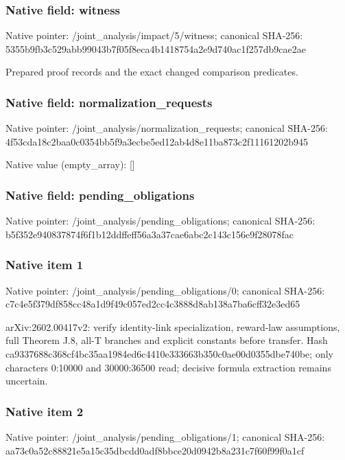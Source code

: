 \documentclass[10pt,a4paper]{article}
\begin{document}
\subsubsection{Native field: witness}
Native pointer: /joint\_\allowbreak{}analysis/impact/5/witness; canonical SHA-256: 5355b9fb3c529abb99043b7f05f8eca4b1418754a2e9d740ac1f257db9cae2ae

\begingroup\raggedright\sloppy Prepared proof records and the exact changed comparison predicates.\par\endgroup

\subsubsection{Native field: normalization\_\allowbreak{}requests}
Native pointer: /joint\_\allowbreak{}analysis/normalization\_\allowbreak{}requests; canonical SHA-256: 4f53cda18c2baa0c0354bb5f9a3ecbe5ed12ab4d8e11ba873c2f11161202b945

Native value (empty\_\allowbreak{}array): []

\subsubsection{Native field: pending\_\allowbreak{}obligations}
Native pointer: /joint\_\allowbreak{}analysis/pending\_\allowbreak{}obligations; canonical SHA-256: b5f352e940837874f6f1b12ddffeff56a3a37cae6abc2c143c156e9f28078fac

\subsubsection{Native item 1}
Native pointer: /joint\_\allowbreak{}analysis/pending\_\allowbreak{}obligations/0; canonical SHA-256: c7c4e5f379df858cc48a1d9f49c057ed2cc4c3888d8ab138a7ba6cff32e3ed65

\begingroup\raggedright\sloppy arXiv:\allowbreak{}2602.00417v2:\allowbreak{} verify identity-link specialization,\allowbreak{} reward-law assumptions,\allowbreak{} full Theorem J.8,\allowbreak{} all-T branches and explicit constants before transfer. Hash ca9337688c368cf4bc35aa1984ed6c4410e333663b350c0ae00d0355dbe740be;\allowbreak{} only characters 0:\allowbreak{}10000 and 30000:\allowbreak{}36500 read;\allowbreak{} decisive formula extraction remains uncertain.\par\endgroup

\subsubsection{Native item 2}
Native pointer: /joint\_\allowbreak{}analysis/pending\_\allowbreak{}obligations/1; canonical SHA-256: aa73c0a52c88821e5a15c35dbcdd0adf8bbce20d0942b8a231c7f60f99f0a1cf
\end{document}
